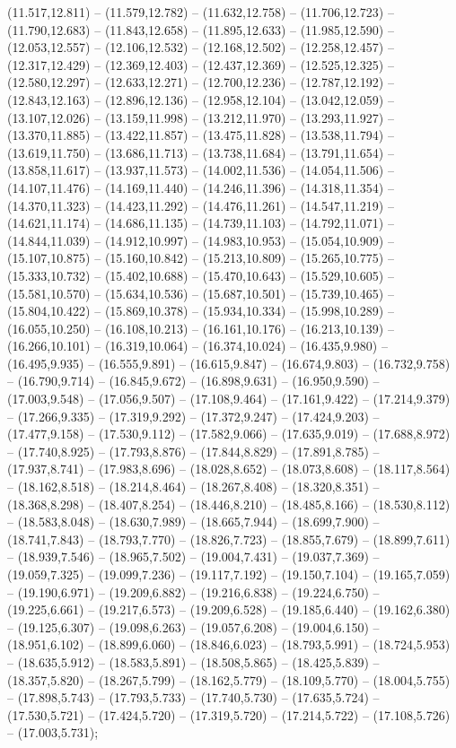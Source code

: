 (11.517,12.811) -- (11.579,12.782) -- (11.632,12.758) -- (11.706,12.723) -- (11.790,12.683) -- (11.843,12.658) -- (11.895,12.633) -- (11.985,12.590) -- (12.053,12.557) -- (12.106,12.532) -- (12.168,12.502) -- (12.258,12.457) -- (12.317,12.429) -- (12.369,12.403) -- (12.437,12.369) -- (12.525,12.325) -- (12.580,12.297) -- (12.633,12.271) -- (12.700,12.236) -- (12.787,12.192) -- (12.843,12.163) -- (12.896,12.136) -- (12.958,12.104) -- (13.042,12.059) -- (13.107,12.026) -- (13.159,11.998) -- (13.212,11.970) -- (13.293,11.927) -- (13.370,11.885) -- (13.422,11.857) -- (13.475,11.828) -- (13.538,11.794) -- (13.619,11.750) -- (13.686,11.713) -- (13.738,11.684) -- (13.791,11.654) -- (13.858,11.617) -- (13.937,11.573) -- (14.002,11.536) -- (14.054,11.506) -- (14.107,11.476) -- (14.169,11.440) -- (14.246,11.396) -- (14.318,11.354) -- (14.370,11.323) -- (14.423,11.292) -- (14.476,11.261) -- (14.547,11.219) -- (14.621,11.174) -- (14.686,11.135) -- (14.739,11.103) -- (14.792,11.071) -- (14.844,11.039) -- (14.912,10.997) -- (14.983,10.953) -- (15.054,10.909) -- (15.107,10.875) -- (15.160,10.842) -- (15.213,10.809) -- (15.265,10.775) -- (15.333,10.732) -- (15.402,10.688) -- (15.470,10.643) -- (15.529,10.605) -- (15.581,10.570) -- (15.634,10.536) -- (15.687,10.501) -- (15.739,10.465) -- (15.804,10.422) -- (15.869,10.378) -- (15.934,10.334) -- (15.998,10.289) -- (16.055,10.250) -- (16.108,10.213) -- (16.161,10.176) -- (16.213,10.139) -- (16.266,10.101) -- (16.319,10.064) -- (16.374,10.024) -- (16.435,9.980) -- (16.495,9.935) -- (16.555,9.891) -- (16.615,9.847) -- (16.674,9.803) -- (16.732,9.758) -- (16.790,9.714) -- (16.845,9.672) -- (16.898,9.631) -- (16.950,9.590) -- (17.003,9.548) -- (17.056,9.507) -- (17.108,9.464) -- (17.161,9.422) -- (17.214,9.379) -- (17.266,9.335) -- (17.319,9.292) -- (17.372,9.247) -- (17.424,9.203) -- (17.477,9.158) -- (17.530,9.112) -- (17.582,9.066) -- (17.635,9.019) -- (17.688,8.972) -- (17.740,8.925) -- (17.793,8.876) -- (17.844,8.829) -- (17.891,8.785) -- (17.937,8.741) -- (17.983,8.696) -- (18.028,8.652) -- (18.073,8.608) -- (18.117,8.564) -- (18.162,8.518) -- (18.214,8.464) -- (18.267,8.408) -- (18.320,8.351) -- (18.368,8.298) -- (18.407,8.254) -- (18.446,8.210) -- (18.485,8.166) -- (18.530,8.112) -- (18.583,8.048) -- (18.630,7.989) -- (18.665,7.944) -- (18.699,7.900) -- (18.741,7.843) -- (18.793,7.770) -- (18.826,7.723) -- (18.855,7.679) -- (18.899,7.611) -- (18.939,7.546) -- (18.965,7.502) -- (19.004,7.431) -- (19.037,7.369) -- (19.059,7.325) -- (19.099,7.236) -- (19.117,7.192) -- (19.150,7.104) -- (19.165,7.059) -- (19.190,6.971) -- (19.209,6.882) -- (19.216,6.838) -- (19.224,6.750) -- (19.225,6.661) -- (19.217,6.573) -- (19.209,6.528) -- (19.185,6.440) -- (19.162,6.380) -- (19.125,6.307) -- (19.098,6.263) -- (19.057,6.208) -- (19.004,6.150) -- (18.951,6.102) -- (18.899,6.060) -- (18.846,6.023) -- (18.793,5.991) -- (18.724,5.953) -- (18.635,5.912) -- (18.583,5.891) -- (18.508,5.865) -- (18.425,5.839) -- (18.357,5.820) -- (18.267,5.799) -- (18.162,5.779) -- (18.109,5.770) -- (18.004,5.755) -- (17.898,5.743) -- (17.793,5.733) -- (17.740,5.730) -- (17.635,5.724) -- (17.530,5.721) -- (17.424,5.720) -- (17.319,5.720) -- (17.214,5.722) -- (17.108,5.726) -- (17.003,5.731);

